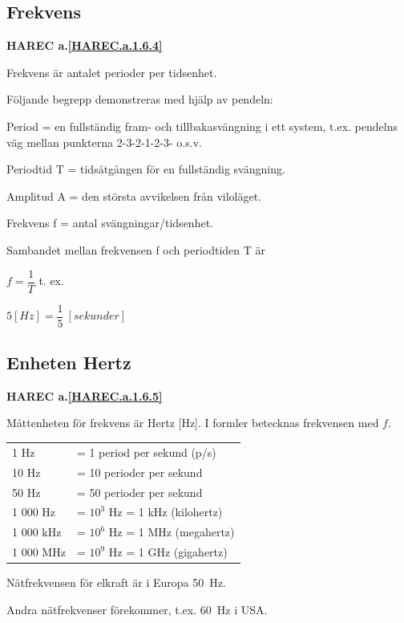 \subsection{Frekvens}
\textbf{HAREC a.\ref{HAREC.a.1.6.4}\label{myHAREC.a.1.6.4}}

Frekvens är antalet perioder per tidsenhet.

Följande begrepp demonstreras med hjälp av pendeln:

Period = en fullständig fram- och tillbakasvängning i ett system, t.ex.
pendelns väg mellan punkterna 2-3-2-1-2-3- o.s.v.

Periodtid T = tidsåtgången för en fullständig svängning.

Amplitud A = den största avvikelsen från viloläget.

Frekvens f = antal svängningar/tidsenhet.

Sambandet mellan frekvensen f och periodtiden T är

\(f=\dfrac{1}{T}\) t. ex.

\(5 [H z] = \dfrac{1}{5}\ [sekunder]\)

\subsection{Enheten Hertz}
\textbf{HAREC a.\ref{HAREC.a.1.6.5}\label{myHAREC.a.1.6.5}}

Måttenheten för frekvens är Hertz [Hz].
I formler betecknas frekvensen med \(f\).

\begin{center}
\begin{tabular}{ll}
1 Hz      & = 1 period per sekund (p/s) \\
10 Hz     & = 10 perioder per sekund \\
50 Hz     & = 50 perioder per sekund \\
1 000 Hz  & = \(10^3\) Hz = 1 kHz (kilohertz) \\
1 000 kHz & = \(10^6\) Hz = 1 MHz (megahertz) \\
1 000 MHz & = \(10^9\) Hz = 1 GHz (gigahertz) \\
\end{tabular}
\end{center}

Nätfrekvensen för elkraft är i Europa 50~Hz.

Andra nätfrekvenser förekommer, t.ex. 60~Hz i USA.


